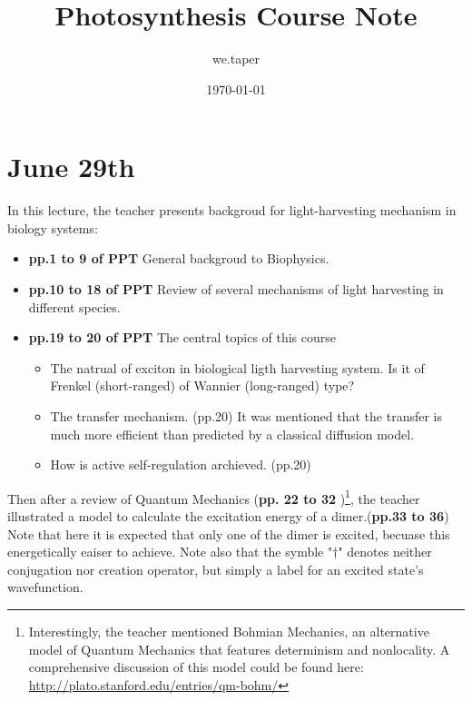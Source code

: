 \documentclass{article}
\title{Photosynthesis Course Note}
\date{\today}
\author{we.taper}
\numberwithin{equation}{subsection} %
\theoremstyle{definition}
\begin{document}
\maketitle

\tableofcontents

\section{June 29th}
\label{sec:June_29th}

In this lecture, the teacher presents backgroud for light-harvesting
mechanism in biology systems:
\begin{itemize}
    \item \textbf{pp.1 to 9 of PPT} 
        General backgroud to Biophysics.
    \item \textbf{pp.10 to 18 of PPT}
        Review of several mechanisms of light harvesting in different 
        species.
    \item \textbf{pp.19 to 20 of PPT}
        The central topics of this course
        \begin{itemize}
            \item The natrual of exciton in biological ligth harvesting 
                system.
                Is it of Frenkel (short-ranged) of Wannier (long-ranged) type?
            \item The transfer mechanism. (pp.20) It was mentioned that
                the transfer is much more efficient than predicted
                by a classical diffusion model.
            \item How is active self-regulation archieved. (pp.20)
        \end{itemize}
\end{itemize}
Then after a review of Quantum Mechanics (\textbf{pp. 22 to 32} )\footnote{
    Interestingly, the teacher mentioned Bohmian Mechanics, an alternative
    model of Quantum Mechanics that features determinism and nonlocality.
    A comprehensive discussion of this model could be found here:
    \url{http://plato.stanford.edu/entries/qm-bohm/}
}, the teacher illustrated a model to calculate
the excitation energy of a dimer.(\textbf{pp.33 to 36})
Note that here it is expected that only one of the
dimer is excited, becuase this energetically eaiser to achieve.
Note also that the
symble "$\dagger$" denotes neither conjugation nor creation operator,
but simply a label for an excited state's wavefunction. 
\end{document}
